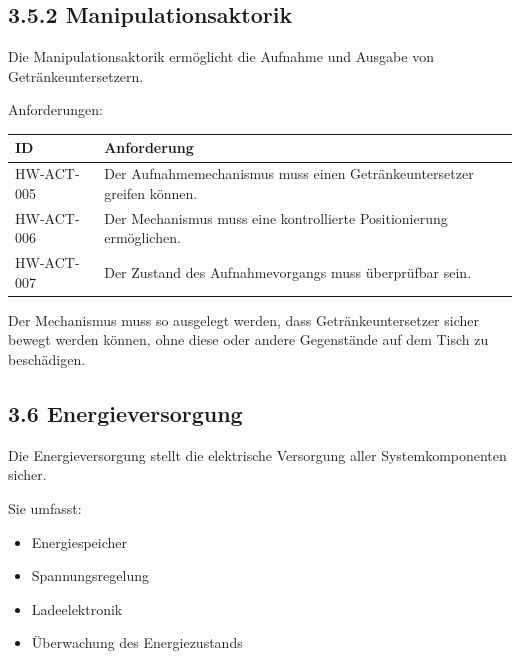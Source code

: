 \documentclass[
  a4paper,
  12pt,
  DIV=12,        %
  parskip=half,  %
  headings=small %
]{scrartcl}
\theoremstyle{definition}
\providecommand{\tightlist}{%
  \setlength{\itemsep}{0pt}\setlength{\parskip}{0pt}}
\theoremstyle{definition}
\providecommand{\tightlist}{%
  \setlength{\itemsep}{0pt}\setlength{\parskip}{0pt}}
\begin{document}
\subsection{3.5.2 Manipulationsaktorik}\label{manipulationsaktorik}

Die Manipulationsaktorik ermöglicht die Aufnahme und Ausgabe von
Getränkeuntersetzern.

Anforderungen:

\begin{longtable}[]{@{}
  >{\raggedright\arraybackslash}p{}
  >{\raggedright\arraybackslash}p{}@{}}
\toprule\noalign{}
\begin{minipage}[b]{\linewidth}\raggedright
ID
\end{minipage} & \begin{minipage}[b]{\linewidth}\raggedright
Anforderung
\end{minipage} \\
\midrule\noalign{}
\endhead
\bottomrule\noalign{}
\endlastfoot
HW-ACT-005 & Der Aufnahmemechanismus muss einen Getränkeuntersetzer
greifen können. \\
HW-ACT-006 & Der Mechanismus muss eine kontrollierte Positionierung
ermöglichen. \\
HW-ACT-007 & Der Zustand des Aufnahmevorgangs muss überprüfbar sein. \\
\end{longtable}

Der Mechanismus muss so ausgelegt werden, dass Getränkeuntersetzer
sicher bewegt werden können, ohne diese oder andere Gegenstände auf dem
Tisch zu beschädigen.

\subsection{3.6 Energieversorgung}\label{energieversorgung}

Die Energieversorgung stellt die elektrische Versorgung aller
Systemkomponenten sicher.

Sie umfasst:

\begin{itemize}
\tightlist
\item
  Energiespeicher
\item
  Spannungsregelung
\item
  Ladeelektronik
\item
  Überwachung des Energiezustands
\end{itemize}
\end{document}
